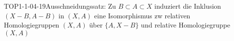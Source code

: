
\begin{THEO}{TOP1-1-04-19}{Ausschneidungssatz: Zu $B\subset A\subset X$ induziert die Inklusion $(X-B,A-B)$ in $(X,A)$ eine Isomorphismus zw relativen Homologiegruppen $(X,A)$ über $\{A,X-B\}
$ und relative Homologiegruppe $(X,A)$}
\end{THEO}
